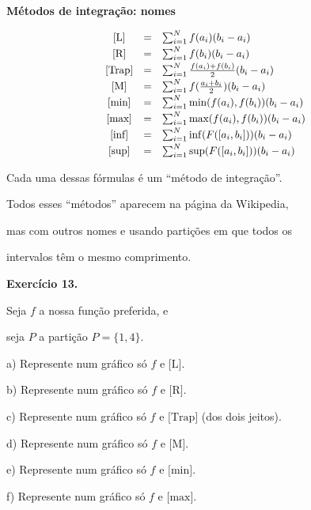 \documentclass[oneside,12pt]{article}
\begin{document}
{\bf Métodos de integração: nomes}

\def\sumiN#1{\sum_{i=1}^N #1 (b_i-a_i)}
\def\mname#1{\text{[#1]}}
%
$$\scalebox{0.95}{$
  \begin{array}{ccl}
  \mname{L}    &=& \sumiN {f(a_i)}                    \\[2pt]
  \mname{R}    &=& \sumiN {f(b_i)}                    \\[2pt]
  \mname{Trap} &=& \sumiN {\frac{f(a_i) + f(b_i)}{2}} \\[2pt]
  \mname{M}    &=& \sumiN {f(\frac{a_i+b_i}{2})}      \\[2pt]
  \mname{min}  &=& \sumiN {\min(f(a_i), f(b_i))}      \\[2pt]
  \mname{max}  &=& \sumiN {\max(f(a_i), f(b_i))}      \\[2pt]
  \mname{inf}  &=& \sumiN {\inf(F([a_i,b_i]))}        \\[2pt]
  \mname{sup}  &=& \sumiN {\sup(F([a_i,b_i]))}        \\
  \end{array}
  $}
$$

Cada uma dessas fórmulas é um ``método de integração''.

Todos esses ``métodos'' aparecem na página da Wikipedia,

mas com outros nomes e usando partições em que todos os

intervalos têm o mesmo comprimento.



\newpage

{\bf Exercício 13.}

Seja $f$ a nossa função preferida, e

seja $P$ a partição $P=\{1,4\}$.

\msk

a) Represente num gráfico só $f$ e $\mname{L}$.

b) Represente num gráfico só $f$ e $\mname{R}$.

c) Represente num gráfico só $f$ e $\mname{Trap}$ (dos dois jeitos).

d) Represente num gráfico só $f$ e $\mname{M}$.

e) Represente num gráfico só $f$ e $\mname{min}$.

f) Represente num gráfico só $f$ e $\mname{max}$.


\end{document}
